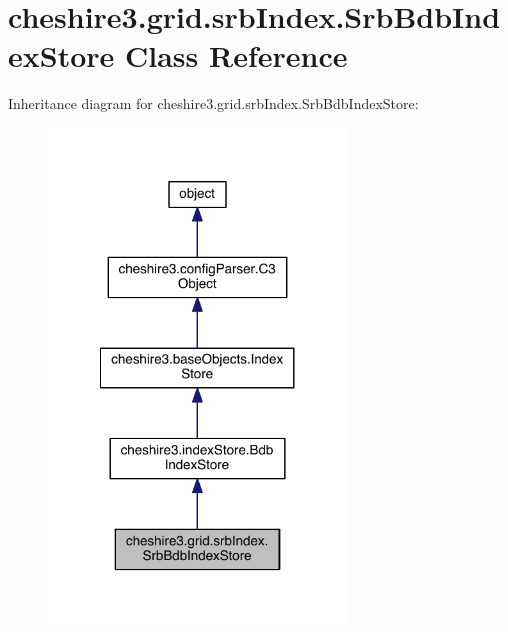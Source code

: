\hypertarget{classcheshire3_1_1grid_1_1srb_index_1_1_srb_bdb_index_store}{\section{cheshire3.\-grid.\-srb\-Index.\-Srb\-Bdb\-Index\-Store Class Reference}
\label{classcheshire3_1_1grid_1_1srb_index_1_1_srb_bdb_index_store}
}


Inheritance diagram for cheshire3.\-grid.\-srb\-Index.\-Srb\-Bdb\-Index\-Store\-:
\nopagebreak
\begin{figure}[H]
\begin{center}
\leavevmode
\includegraphics[width=224pt]{classcheshire3_1_1grid_1_1srb_index_1_1_srb_bdb_index_store__inherit__graph}
\end{center}
\end{figure}



